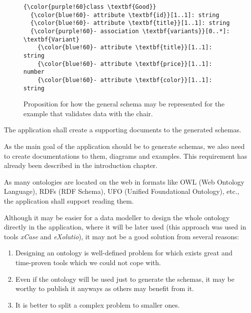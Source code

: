 \begin{figure}[h!]\centering
  \begin{Verbatim}[commandchars=\\\{\}]
{\color{purple!60}class \textbf{Good}}
  {\color{blue!60}- attribute \textbf{id}}[1..1]: string
  {\color{blue!60}- attribute \textbf{title}}[1..1]: string
  {\color{purple!60}- association \textbf{variants}}[0..*]: \textbf{Variant}
    {\color{blue!60}- attribute \textbf{title}}[1..1]: string
    {\color{blue!60}- attribute \textbf{price}}[1..1]: number
    {\color{blue!60}- attribute \textbf{color}}[1..1]: string
\end{Verbatim}
  \caption{Proposition for how the general schema may be represented for the example that validates data with the chair.}
\end{figure}

\bigskip




\begin{requirement}
    The application shall create a supporting documents to the generated schemas.
\end{requirement}

As the main goal of the application should be to generate schemas, we also need to create documentations to them, diagrams and examples. This requirement has already been described in the introduction chapter. %

\begin{requirement}
    \label{requirement:ontologies-on-the-web}
    As many ontologies are located on the web in formats like OWL (Web Ontology Language), RDFs (RDF Schema), UFO (Unified Foundational Ontology), etc., the application shall support reading them.
\end{requirement}

Although it may be easier for a data modeller to design the whole ontology directly in the application, where it will be later used (this approach was used in tools \textit{xCase} and \textit{eXolutio}), it may not be a good solution from several reasons:

\begin{enumerate}
    \item Designing an ontology is well-defined problem for which exists great and time-proven tools which we could not cope with.
    \item Even if the ontology will be used just to generate the schemas, it may be worthy to publish it anyways as others may benefit from it.
    \item It is better to split a complex problem to smaller ones.
\end{enumerate}

